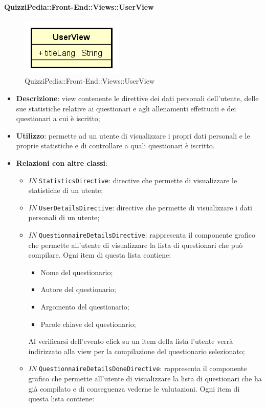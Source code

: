 \paragraph{QuizziPedia::Front-End::Views::UserView}
\begin{figure} [ht]
	\centering
	\includegraphics[scale=0.45]{UML/Classi/Front-End/QuizziPedia_Front-end_Views_UserView.png}
	\caption{QuizziPedia::Front-End::Views::UserView}
\end{figure} \FloatBarrier
\begin{itemize}
	\item \textbf{Descrizione}: view contenente le direttive dei dati personali dell'utente, delle sue statistiche relative ai questionari e agli allenamenti effettuati e dei questionari a cui è iscritto;
	\item \textbf{Utilizzo}:  permette ad un utente di visualizzare i propri dati personali e le proprie statistiche e di controllare a quali questionari è iscritto. 
	\item \textbf{Relazioni con altre classi}:
	\begin{itemize}
		\item \textit{IN} \texttt{StatisticsDirective}: directive che permette di visualizzare le statistiche di un utente;
		\item \textit{IN} \texttt{UserDetailsDirective}: directive che permette di visualizzare i dati personali di un utente;
		\item \textit{IN} \texttt{QuestionnaireDetailsDirective}: rappresenta il componente grafico che permette all'utente di visualizzare la lista di questionari che può compilare. Ogni item di questa lista contiene:
		\begin{itemize}
			\item Nome del questionario;
			\item Autore del questionario;
			\item Argomento del questionario;
			\item Parole chiave del questionario;
		\end{itemize}
		Al verificarsi dell'evento click su un item della lista l'utente verrà indirizzato alla view per la compilazione del questionario selezionato;
		\item \textit{IN} \texttt{QuestionnaireDetailsDoneDirective}: rappresenta il componente grafico che permette all'utente di visualizzare la lista di questionari che ha già compilato e di conseguenza vederne le valutazioni. Ogni item di questa lista contiene:

\end{itemize}
\end{itemize}
